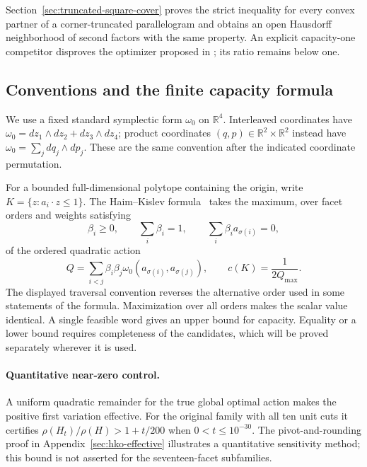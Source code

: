 \documentclass[a4paper,11pt]{article}
\theoremstyle{definition}
\theoremstyle{remark}
\begin{document}
Section~\ref{sec:truncated-square-cover} proves the strict inequality for
every convex partner of a corner-truncated parallelogram and obtains an open
Hausdorff neighborhood of second factors with the same property. An explicit
capacity-one competitor disproves the optimizer proposed in
\cite{BMP2026}; its ratio remains below one.

\subsection{Conventions and the finite capacity formula}

We use a fixed standard symplectic form $\omega_0$ on $\mathbb R^4$.
Interleaved coordinates have
$\omega_0=dz_1\wedge dz_2+dz_3\wedge dz_4$; product coordinates
$(q,p)\in\mathbb R^2\times\mathbb R^2$ instead have
$\omega_0=\sum_jdq_j\wedge dp_j$. These are the same convention after
the indicated coordinate permutation.

For a bounded full-dimensional polytope containing the origin, write
$K=\{z:a_i\cdot z\leq1\}$. The Haim--Kislev formula~\cite{HK2017} takes the
maximum, over facet orders and weights satisfying
\[
 \beta_i\geq0,\qquad \sum_i\beta_i=1,\qquad
 \sum_i\beta_i a_{\sigma(i)}=0,
\]
of the ordered quadratic action
\[
 Q=\sum_{i<j}\beta_i\beta_j\omega_0(a_{\sigma(i)},a_{\sigma(j)}),
 \qquad c(K)=\frac1{2Q_{\max}}.
\]
The displayed traversal convention reverses the alternative order used in
some statements of the formula. Maximization over all orders makes the
scalar value identical. A single feasible word gives an upper bound for
capacity. Equality or a lower bound requires completeness of the candidates,
which will be proved separately wherever it is used.








\paragraph{Quantitative near-zero control.}
A uniform quadratic remainder for the true global optimal action makes the
positive first variation effective. For the original family with all ten
unit cuts it certifies $\rho(H_t)/\rho(H)>1+t/200$ when
$0<t\leq10^{-30}$. The pivot-and-rounding proof in
Appendix~\ref{sec:hko-effective} illustrates a quantitative sensitivity
method; this bound is not asserted for the seventeen-facet subfamilies.
\end{document}
